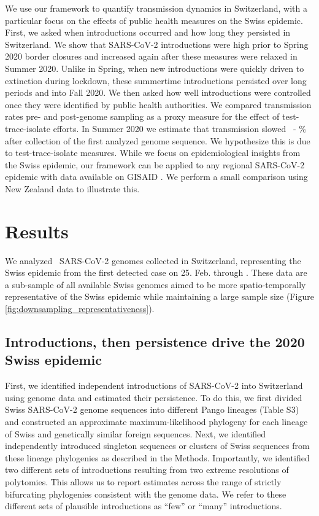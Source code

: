 \documentclass[9pt,twoside,lineno]{pnas-new} %
\begin{document}
We use our framework to quantify transmission dynamics in Switzerland, with a particular focus on the effects of public health measures on the Swiss epidemic. First, we asked when introductions occurred and how long they persisted in Switzerland. We show that SARS-CoV-2 introductions were high prior to Spring 2020 border closures and increased again after these measures were relaxed in Summer 2020. Unlike in Spring, when new introductions were quickly driven to extinction during lockdown, these summertime introductions persisted over long periods and into Fall 2020. We then asked how well introductions were controlled once they were identified by public health authorities. We compared transmission rates pre- and post-genome sampling as a proxy measure for the effect of test-trace-isolate efforts. In Summer 2020 we estimate that transmission slowed \summermaxdampingpercentmedianCHEnosampUB\ - \summermindampingpercentmedianCHEnosampUB\% after collection of the first analyzed genome sequence. We hypothesize this is due to test-trace-isolate measures. While we focus on epidemiological insights from the Swiss epidemic, our framework can be applied to any regional SARS-CoV-2 epidemic with data available on GISAID \cite{GISAID}. We perform a small comparison using New Zealand data to illustrate this. 

\section{Results}
We analyzed \nfocalsamples\ SARS-CoV-2 genomes collected in Switzerland, representing the Swiss epidemic from the first detected case on 25. Feb. through \maxdate. These data are a sub-sample of all available Swiss genomes aimed to be more spatio-temporally representative of the Swiss epidemic while maintaining a large sample size (Figure  \ref{fig:downsampling_representativeness}). 

\subsection{Introductions, then persistence drive the 2020 Swiss epidemic}

First, we identified independent introductions of SARS-CoV-2 into Switzerland using genome data and estimated their persistence. To do this, we first divided Swiss SARS-CoV-2 genome sequences into different Pango lineages (Table S3) and constructed an approximate maximum-likelihood phylogeny for each lineage of Swiss and genetically similar foreign sequences. Next, we identified independently introduced singleton sequences or clusters of Swiss sequences from these lineage phylogenies as described in the Methods. Importantly, we identified two different sets of introductions resulting from two extreme resolutions of polytomies. This allows us to report estimates across the range of strictly bifurcating phylogenies consistent with the genome data. We refer to these different sets of plausible introductions as ``few'' or ``many'' introductions.
\end{document}
